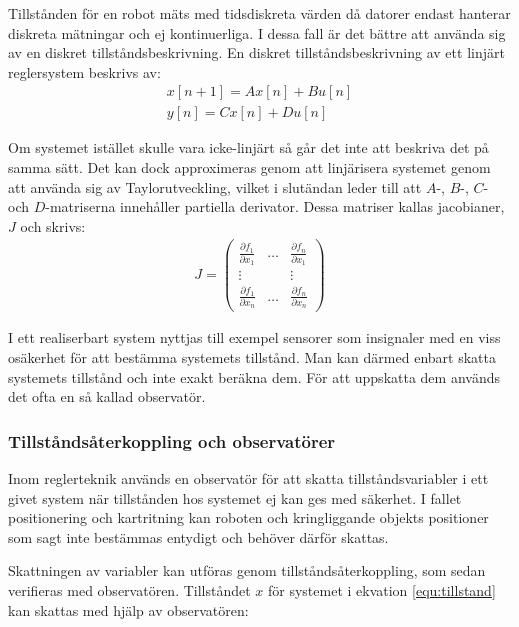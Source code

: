 \documentclass[a4paper,12pt,fleqn]{article}
\begin{document}
Tillstånden för en robot mäts med tidsdiskreta värden då datorer endast hanterar diskreta mätningar och ej kontinuerliga. I dessa fall är det bättre att använda sig av en diskret tillståndsbeskrivning. En diskret tillståndsbeskrivning av ett linjärt reglersystem beskrivs av: 
\begin{gather}
x[n+1] = Ax[n] + Bu[n] \\
y[n] = Cx[n] + Du[n]
\end{gather}

Om systemet istället skulle vara icke-linjärt så går det inte att beskriva det på samma sätt. Det kan dock approximeras genom att linjärisera systemet genom att använda sig av Taylorutveckling, vilket i slutändan leder till att $A$-, $B$-, $C$- och $D$-matriserna innehåller partiella derivator. Dessa matriser kallas jacobianer, $J$ och skrivs:
\begin{gather}
	J= \begin{pmatrix}
	\frac{\partial f_1}{\partial x_1} & \dots & \frac{\partial f_n}{\partial x_1} \\
	  							\vdots &       & \vdots \\
	  \frac{\partial f_1}{\partial x_n} & \dots & \frac{\partial f_n}{\partial x_n}
	  \end{pmatrix}
\end{gather}



I ett realiserbart system nyttjas till exempel sensorer som insignaler med en viss osäkerhet för att bestämma systemets tillstånd. Man kan därmed enbart skatta systemets tillstånd och inte exakt beräkna dem. För att uppskatta dem används det ofta en så kallad observatör.

\subsubsection{Tillståndsåterkoppling och observatörer}

Inom reglerteknik används en observatör för att skatta tillståndsvariabler i ett givet system när tillstånden hos systemet ej kan ges med säkerhet. I fallet positionering och kartritning kan roboten och kringliggande objekts positioner som sagt inte bestämmas entydigt och behöver därför skattas. 

Skattningen av variabler kan utföras genom tillståndsåterkoppling, som sedan verifieras med observatören.  Tillståndet $x$ för systemet i ekvation \ref{equ:tillstand} kan skattas med hjälp av observatören: 
\end{document}
